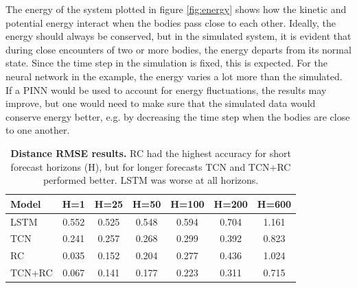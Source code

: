 \documentclass[%
 reprint,
 amsmath,amssymb,
 aps,
]{revtex4-2}
\begin{document}
The energy of the system plotted in figure \ref{fig:energy} shows how the kinetic and potential energy interact when the bodies pass close to each other. Ideally, the energy should always be conserved, but in the simulated system, it is evident that during close encounters of two or more bodies, the energy departs from its normal state. Since the time step in the simulation is fixed, this is expected. For the neural network in the example, the energy varies a lot more than the simulated. If a PINN would be used to account for energy fluctuations, the results may improve, but one would need to make sure that the simulated data would conserve energy better, e.g. by decreasing the time step when the bodies are close to one another. %


\begin{table}[htbp]
    \centering
    \caption{{\bf Distance RMSE results.} RC had the highest accuracy for short forecast horizons (H), but for longer forecasts TCN and TCN+RC performed better. LSTM was worse at all horizons.}
    \label{tab:distance_rmse_updated}
    \begin{tabular}{|l|c|c|c|c|c|c|}
        \hline
        \textbf{Model} & \textbf{H=1} & \textbf{H=25} & \textbf{H=50} & \textbf{H=100} & \textbf{H=200} & \textbf{H=600} \\
        \hline
        LSTM & 0.552 & 0.525 & 0.548 & 0.594 & 0.704 & 1.161 \\
        \hline
        TCN & 0.241 & 0.257 & 0.268 & 0.299 & 0.392 & 0.823 \\
        \hline
        RC & 0.035 & 0.152 & 0.204 & 0.277 & 0.436 & 1.024 \\
        \hline
        TCN+RC & 0.067 & 0.141 & 0.177 & 0.223 & 0.311 & 0.715 \\
        \hline
    \end{tabular}
\end{table}
\end{document}
